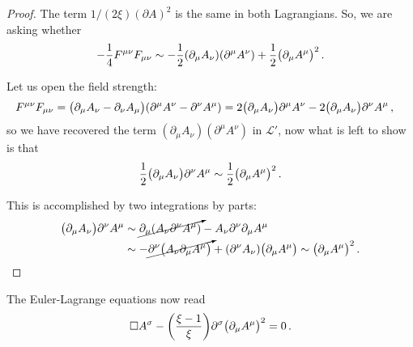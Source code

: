 \documentclass[main.tex]{subfiles}
\begin{document}
\begin{proof}
The term \(1/(2\xi) (\partial A)^2 \) is the same in both Lagrangians. So, we are asking whether 
%
\begin{align}
- \frac{1}{4} F^{\mu \nu} F_{\mu \nu } \sim -\frac{1}{2} (\partial_{\mu } A_{\nu }) \qty(\partial^{\mu } A^{\nu }) + \frac{1}{2} \qty(\partial_{\mu } A^{\mu })^2
\,.
\end{align}

Let us open the field strength: 
%
\begin{align}
F^{\mu \nu } F_{\mu \nu } =
\qty(\partial_{\mu } A_{\nu } - \partial_{\nu } A_{\mu })
\qty(\partial^{\mu } A^{\nu } - \partial^{\nu } A^{\mu })
&= 2 \qty(\partial_{\mu } A_{\nu }) \partial^{\mu} A^{\nu }
- 2 \qty(\partial_{\mu } A_{\nu }) \partial^{\nu }A^{\mu }  
\,,
\end{align}
%
so we have recovered the term \((\partial_{\mu } A_{\nu })(\partial^{\mu } A^{\nu })\) in \(\mathscr{L}'\), now what is left to show is that 
%
\begin{align}
\frac{1}{2} \qty(\partial_{\mu } A_{\nu }) \partial^{\nu }A^{\mu }  
\sim \frac{1}{2} \qty(\partial_{\mu } A^{\mu })^2
\,.
\end{align}

This is accomplished by two integrations by parts: 
%
\begin{subequations}
\begin{align}
\qty(\partial_{\mu } A_{\nu }) \partial^{\nu }A^{\mu }
&\sim \cancelto{}{\partial_{\mu } \qty(A_{\nu } \partial^{\nu } A^{\mu })}
- A_{\nu} \partial^{\nu }\partial_{\mu } A^{\mu }   \\
&\sim
-\cancelto{}{\partial^{\nu } \qty(A_{\nu } \partial_{\mu }A^{\mu })}
+ \qty(\partial^{\nu } A_{\nu }) \qty(\partial_{\mu }A^{\mu })
\sim
 \qty(\partial_{\mu }A^{\mu })^2
\,.
\end{align}
\end{subequations}
\end{proof}

\begin{claim}
The Euler-Lagrange equations now read 
%
\begin{align}
\square A^{\sigma } - \qty(\frac{\xi -1}{\xi }) \partial^{\sigma }
\qty(\partial_{\mu } A^{ \mu })^2 = 0
\,.
\end{align}
\end{claim}
\end{document}

